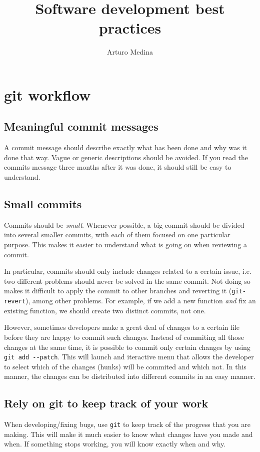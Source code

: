 \documentclass{article}
\title{%
Software development best practices}
\author{Arturo Medina}
\begin{document}
\maketitle{}
\section{git workflow}

\subsection{Meaningful commit messages}
A commit message should describe exactly what has been done and why was it
done that way. Vague or generic descriptions should be avoided. If you read the
commits message three months after it was done, it should still be easy to
understand.

\subsection{Small commits}
Commits should be \emph{small}. Whenever possible, a big commit should be
divided into several smaller commits, with each of them focused on one
particular purpose. This makes it easier to understand what is going on when reviewing a commit.

In particular, commits should only include changes related to a certain issue,
i.e. two different problems should never be solved in the same commit.
Not doing so makes it difficult to apply the commit to other branches and
reverting it (\verb|git-revert|), among other problems. For example, if we add a
new function \emph{and} fix an existing
function, we should create two distinct commits, not one.

However, sometimes developers make a great deal of changes to a certain file
before they are happy to commit such changes. Instead of commiting all those
changes at the same time, it is possible to commit only certain changes
by using \verb|git add --patch|. This will launch and iteractive menu that
allows the developer to select which of the changes (hunks) will be
commited and which not. In this manner, the changes can be distributed
into different commits in an easy manner.


\subsection{Rely on git to keep track of your work}
When developing/fixing bugs, use \verb|git| to keep track of the progress that
you are making. This will make it much easier to know what changes have you
made and when. If something stops working, you will know exactly when and why.
\end{document}
